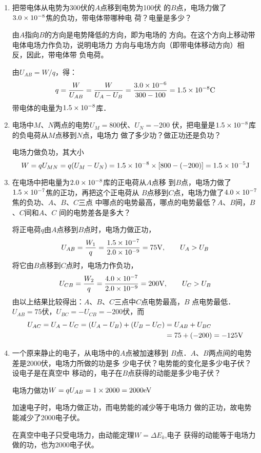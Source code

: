 \begin{enumerate}
	\item 把带电体从电势为300伏的$A$点移到电势为100伏
的$B$点，电场力做了$3.0\times10^{-8}$焦的负功，带电体带哪种电
荷？电量是多少？

\begin{solution}
    由$A$指向$B$的方向是电势降低的方向，即为电场的
    方向。在这个方向上移动带电体电场力作负功，说明电场力
    方向与电场方向（即带电体移动方向）相反，因此，带电体带
    负电荷。

    由$U_{AB}=W/q$，得：
    \[q=\frac{W}{U_{AB}}=\frac{W}{U_A-U_B}=\frac{3.0\times 10^{-6}}{300-100}=1.5\times 10^{-8}{\rm C}\]
    带电体的电量为$1.5\times 10^{-8}$库．
\end{solution}

\item 电场中$M$、$N$两点的电势$U_M=800$伏、$U_N=-200$
伏，把电量是$1.5\times10^{-8}$库的负电荷从$M$点移到$N$点，电场力
做了多少功？做正功还是负功？

\begin{solution}
    电场力做负功，其大小
  \[  W=qU_{MN}=q(U_M-U_N)=1.5\times10^{-8}\times[800-(-200)]=1.5\times10^{-5}{\rm J}\]
\end{solution}

\item 在电场中把电量为$2.0\times10^{-8}$库的正电荷从$A$点移
到$B$点，电场力做了$1.5\times10^{-7}$焦的正功，再把这个正电荷从
$B$点移到$C$点，电场力做了$4.0\times10^{-7}$焦的负功、$A$、$B$、$C$三点
中哪点的电势最高，哪点的电势最低？$A$、$B$间，$B$、$C$间和$A$、$C$
间的电势差各是多大？

\begin{solution}
    将正电荷$q$由$A$点移到$B$点时，电场力做正功，
   \[ U_{AB}=\frac{W_1}{q}=\frac{1.5\times 10^{-7}}{2.0\times 10^{-9}}=75{\rm V},\qquad U_A>U_B\]
    将它由$B$点移到$C$点时，电场力作负功，
    \[ U_{CB}=\frac{W_2}{q}=\frac{4.0\times 10^{-7}}{2.0\times 10^{-9}}=200{\rm V},\qquad U_C>U_B\]  
    由以上结果比较得出：$A$、$B$、$C$三点中$C$点电势最高，$B$
    点电势最低．$U_{AB}=75$伏，$U_{BC}=-U_{CB}=-200$伏，而
\[\begin{split}
    U_{AC}=U_A-U_C=(U_A-U_B)+(U_B-U_C)&=U_{AB}+U_{BC}\\
    &=75+(-200)=-125{\rm V}
\end{split}\]
\end{solution}

\item 一个原来静止的电子，从电场中的$A$点被加速移到
$B$点．$A$、$B$两点间的电势差是2000伏，电场力所做的功是多
少电子伏？电势能的变化是多少电子伏？设电子是在真空中
移动的，电子在$B$点获得的动能是多少电子伏？

\begin{solution}
    电场力做功$W=qU_{AB}=1\times2000=2000{\rm eV}$

    加速电子时，电场力做正功，而电势能的减少等于电场力
    做的正功，故电势能减少了2000电子伏。

    在真空中电子只受电场力，由动能定理$W=\Delta E_k$,电子
    获得的动能等于电场力做的功，也为2000电子伏。
\end{solution}

\end{enumerate}


